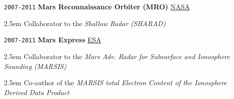 \noindent \texttt{2007-2011} \tab \textbf{Mars Reconnaissance Orbiter (MRO)} \tab
\href{https://mars.nasa.gov/mro/}{NASA}
\begin{adjustwidth}{2.5em}{}
Collaborator to the \textit{Shallow Radar (SHARAD)}
\end{adjustwidth}
\vspace{.5em}

\noindent \texttt{2007-2011} \tab \textbf{Mars Express} \tab
\href{https://www.esa.int/Science_Exploration/Space_Science/Mars_Express}{ESA}
\begin{adjustwidth}{2.5em}{}
Collaborator to the \textit{Mars Adv. Radar for Subsurface and Ionosphere Sounding (MARSIS)}
\end{adjustwidth}
\begin{adjustwidth}{2.5em}{}
Co-author of the \textit{MARSIS total Electron Content of the Ionosphere Derived Data Product}
\end{adjustwidth}
\vspace{.5em}


    
    
    
    
    
    
    
    
